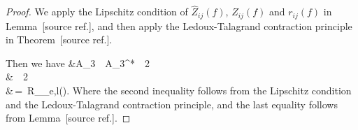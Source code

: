 \documentclass[twoside,11pt]{article}
\makeatletter
\newcommand{\discardlabel}[1]{}
\newcommand{\discardtwo}[2]{}
\newcommand{\legacyref}[1]{\textup{[source ref.]}}
\newcommand{\legacyeqref}[1]{\textup{[source equation]}}
\newenvironment{legacycomparison}{%
  \begingroup\color{legacygray}%
  \let\label\discardlabel
  \let\originallabel\discardlabel
  \let\ref\legacyref
  \let\pageref\legacyref
  \let\eqref\legacyeqref
  \let\cref\legacyref
  \let\Cref\legacyref
  \let\autoref\legacyref
  \let\aliasref\discardtwo
}{\endgroup}
\newcommand{\aliasref}[2]{%
  \@ifundefined{r@#2}{}{%
    \expandafter\let\csname r@#1\expandafter\endcsname\csname r@#2\endcsname}}
\makeatother
\begin{document}
\begin{legacycomparison}
\begin{proof}
We apply the Lipschitz condition of $\hat Z_{ij}(f)$, $Z_{ij}(f)$ and $r_{ij}(f)$ in Lemma~\ref{lem:lip}, and then apply the 
Ledoux-Talagrand contraction principle in Theorem~\ref{lem:Theorem 7}. 


Then we have
\beq
&A_3 \,\le\, A_3^* \,\le\, 2 \\
& \,\le\, 2 \\
&\,=\, R_{_{e,l}}(\gF \cap {}).
\beq
Where the second inequality follows from the Lipschitz condition and the Ledoux-Talagrand contraction principle, and the last equality follows from Lemma~\ref{side_lemma_for_block}.
\end{proof}






\end{legacycomparison}
\end{document}
